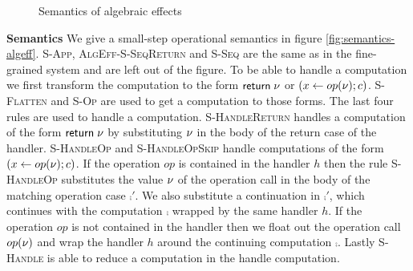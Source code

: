 {\begin{figure}
\caption{Semantics of algebraic effects}
\centering
{}
\end{figure}

\textbf{Semantics}
We give a small-step operational semantics in figure \ref{fig:semantics-algeff}.
\textsc{S-App}, \textsc{AlgEff-S-SeqReturn} and \textsc{S-Seq} are the same as in the fine-grained system and are left out of the figure.
To be able to handle a computation we first transform the computation to the form $\mathsf{return} \; \nu$ or $(x \leftarrow op(\nu) ; c)$.
\textsc{S-Flatten} and \textsc{S-Op} are used to get a computation to those forms.
The last four rules are used to handle a computation.
\textsc{S-HandleReturn} handles a computation of the form $\mathsf{return} \; \nu$ by substituting $\nu$ in the body of the return case of the handler.
\textsc{S-HandleOp} and \textsc{S-HandleOpSkip} handle computations of the form $(x \leftarrow op(\nu) ; c)$.
If the operation $op$ is contained in the handler $h$ then the rule \textsc{S-HandleOp} substitutes the value $\nu$ of the operation call in the body of the matching operation case $\comp'$.
We also substitute a continuation in $\comp'$, which continues with the computation $\comp$ wrapped by the same handler $h$.
If the operation $op$ is not contained in the handler then we float out the operation call $op(\nu)$ and wrap the handler $h$ around the continuing computation $\comp$.
Lastly \textsc{S-Handle} is able to reduce a computation in the handle computation.

}
